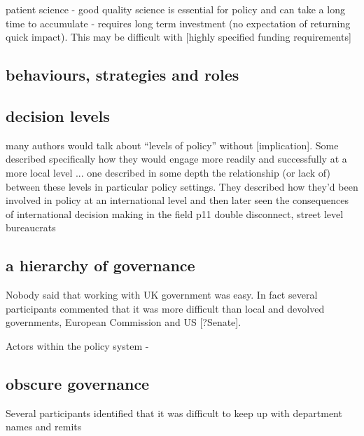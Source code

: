 patient science - good quality science is essential for policy and can take a long time to accumulate - requires long term investment (no expectation of returning quick impact). This may be difficult with [highly specified funding requirements]


\subsection{behaviours, strategies and roles}

\subsection{decision levels}
many authors would talk about ``levels of policy'' without [implication]. Some described specifically how they would engage more readily and successfully at a more local level ... one described in some depth the relationship (or lack of) between these levels in particular policy settings. They described how they'd been involved in policy at an international level and then later seen the consequences of international decision making in the field p11 double disconnect, street level bureaucrats

\subsection{a hierarchy of governance}
Nobody said that working with UK government was easy. In fact several participants commented that it was more difficult than local and devolved governments, European Commission and US [?Senate]. 

Actors within the policy system - 

\subsection{obscure governance}

Several participants identified that it was difficult to keep up with department names and remits 


